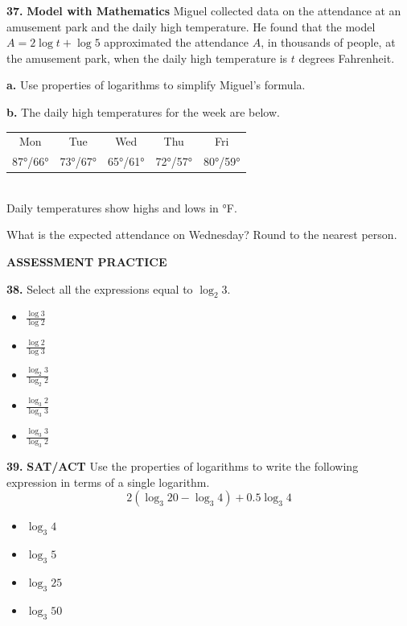 \documentclass{article}
\newenvironment{practice}[2]{\textbf{#1.}}{}
\newcommand{\answer}[1]{}
\begin{document}
\begin{practice}{37}{}
\textbf{Model with Mathematics} Miguel collected data on the attendance at an amusement park and the daily high temperature. He found that the model $A = 2\log t + \log 5$ approximated the attendance $A$, in thousands of people, at the amusement park, when the daily high temperature is $t$ degrees Fahrenheit.

\textbf{a.} Use properties of logarithms to simplify Miguel's formula.
\answer{$A = \log(5t^2)$}

\textbf{b.} The daily high temperatures for the week are below.

\begin{center}
\begin{tabular}{ccccc}
Mon & Tue & Wed & Thu & Fri \\
87°/66° & 73°/67° & 65°/61° & 72°/57° & 80°/59° \\
\end{tabular} \\
\footnotesize Daily temperatures show highs and lows in °F.
\end{center}

What is the expected attendance on Wednesday? Round to the nearest person.
\answer{$A = \log(5 \cdot 65^2) \approx 4.325$ thousand $\implies 4,325$ people}
\end{practice}

\vspace{1em}
\textbf{ASSESSMENT PRACTICE}

\begin{practice}{38}{}
Select all the expressions equal to $\log_2 3$.
\begin{itemize}
    \item[$\square$] $\frac{\log 3}{\log 2}$
    \item[$\square$] $\frac{\log 2}{\log 3}$
    \item[$\square$] $\frac{\log_2 3}{\log_2 2}$
    \item[$\square$] $\frac{\log_3 2}{\log_3 3}$
    \item[$\square$] $\frac{\log_3 3}{\log_3 2}$
\end{itemize}
\answer{Select options 1, 3, and 5.}
\end{practice}

\begin{practice}{39}{}
\textbf{SAT/ACT} Use the properties of logarithms to write the following expression in terms of a single logarithm.
\[ 2(\log_3 20 - \log_3 4) + 0.5 \log_3 4 \]
\begin{itemize}
    \item[A] $\log_3 4$
    \item[B] $\log_3 5$
    \item[C] $\log_3 25$
    \item[D] $\log_3 50$
\end{itemize}
\answer{D}
\end{practice}
\end{document}
